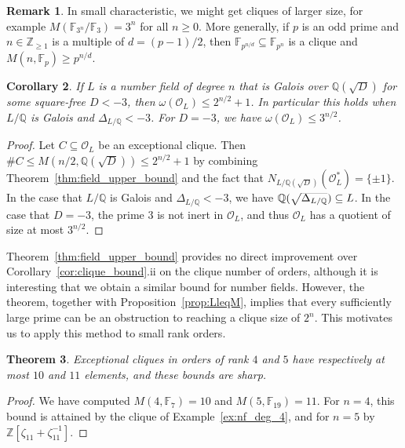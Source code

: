 \documentclass{amsart}
\theoremstyle{plain}
\newtheorem{theorem}{Theorem}[section]
\newtheorem{corollary}[theorem]{Corollary}
\theoremstyle{definition}
\newtheorem{remark}[theorem]{Remark}
\newcommand{\Z}{\ensuremath{\mathbb{Z}}}
\newcommand{\Q}{\ensuremath{\mathbb{Q}}}
\newcommand{\F}{\ensuremath{\mathbb{F}}}
\newcommand{\clq}{C}
\begin{document}
\begin{remark}
	In small characteristic, we might get cliques of larger size, for example $M(\F_{3^n}/\F_3)=3^n$ for all \(n\geq0\). More generally, if $p$ is an odd prime and \(n\in\Z_{\geq 1}\) is a multiple of \(d=(p-1)/2\), then \(\F_{p^{n/d}}\subseteq \F_{p^n}\) is a clique and \(M(n,\F_p)\geq p^{n/d}\).
\end{remark}

\begin{corollary}
	If \(L\) is a number field of degree \(n\) that is Galois over \(\Q(\sqrt{D})\) for some square-free \(D<-3\), then \(\omega(\mathcal{O}_L)\leq 2^{n/2}+1\). In particular this holds when \(L/\Q\) is Galois and \(\Delta_{L/\Q}<-3\). For \(D=-3\), we have \(\omega(\mathcal{O}_L)\leq 3^{n/2}\).
\end{corollary}
\begin{proof}
	Let \(\clq\subseteq\mathcal{O}_L\) be an exceptional clique. 
	Then \(\#\clq\leq M(n/2,\Q(\sqrt{D}))\leq 2^{n/2}+1\) by combining Theorem~\ref{thm:field_upper_bound} and the fact that \(N_{L/\Q(\sqrt{D})}(\mathcal{O}_L^*)=\{\pm1\}\). 
	In the case that \(L/\Q\) is Galois and \(\Delta_{L/\Q}<-3\), we have \(\smash{\Q(\sqrt{\Delta_{L/\Q}})}\subseteq L\). 
	In the case that \(D=-3\), the prime \(3\) is not inert in \(\mathcal{O}_L\), and thus \(\mathcal{O}_L\) has a quotient of size at most \(3^{n/2}\).
\end{proof}

Theorem~\ref{thm:field_upper_bound} provides no direct improvement over Corollary~\ref{cor:clique_bound}.ii on the clique number of orders, although it is interesting that we obtain a similar bound for number fields. However, the theorem, together with Proposition~\ref{prop:LleqM}, implies that every sufficiently large prime can be an obstruction to reaching a clique size of \(2^n\). This motivates us to apply this method to small rank orders.

\begin{theorem}\label{thm:computational_commutative}
	Exceptional cliques in orders of rank \(4\) and \(5\) have respectively at most \(10\) and \(11\) elements, and these bounds are sharp.
\end{theorem}
\begin{proof}
	We have computed \(M(4,\F_7)=10\) and \(M(5,\F_{19})=11\).
	For \(n=4\), this bound is attained by the clique of Example~\ref{ex:nf_deg_4}, and for \(n=5\) by \(\Z[\zeta_{11}+\zeta_{11}^{-1}]\).
\end{proof}
\end{document}

